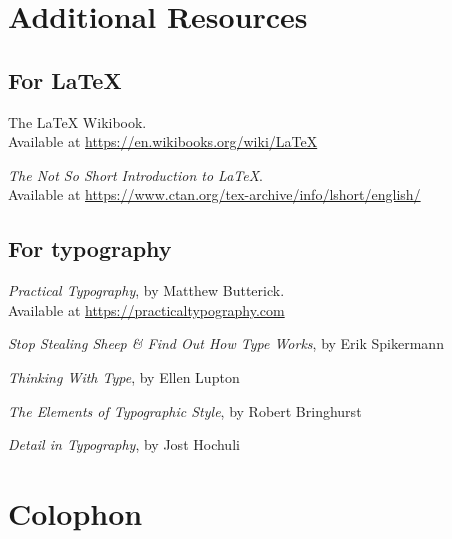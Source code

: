 \setlength\parskip{\baselineskip}
\setlength\parindent{0pt}

\chapter{Additional Resources}
\label{resources}

\section{For \texorpdfstring{\LaTeX}{LaTeX}}

\begin{adjustwidth}{1.5em}{0pt}
The \LaTeX{} Wikibook. \\
Available at \url{https://en.wikibooks.org/wiki/LaTeX}

\textit{The Not So Short Introduction to \LaTeX}. \\
Available at \url{https://www.ctan.org/tex-archive/info/lshort/english/}
\end{adjustwidth}
\vspace{0.3in}

\section{For typography}

\begin{adjustwidth}{1.5em}{0pt}
\textit{Practical Typography}, by Matthew Butterick. \\
Available at \url{https://practicaltypography.com}

\textit{Stop Stealing Sheep \& Find Out How Type Works}, by Erik Spikermann

\textit{Thinking With Type}, by Ellen Lupton

\textit{The Elements of Typographic Style}, by Robert Bringhurst

\textit{Detail in Typography}, by Jost Hochuli
\end{adjustwidth}

\backmatter


{\raggedright
\renewcommand\makeenmark{\theenmark.\enspace}
\theendnotes
}

\chapter{Colophon}

